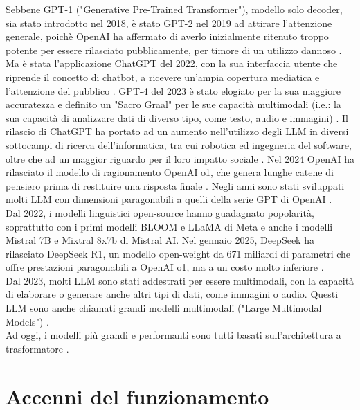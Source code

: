Sebbene GPT-1 ("Generative Pre-Trained Transformer"), modello solo decoder, sia stato introdotto nel 2018, è stato GPT-2 nel 2019 ad attirare l'attenzione generale, poichè OpenAI ha affermato di averlo inizialmente ritenuto troppo potente per essere rilasciato pubblicamente, per timore di un utilizzo dannoso \cite{hern2019fakeai}. Ma è stata l'applicazione ChatGPT del 2022, con la sua interfaccia utente che riprende il concetto di chatbot, a ricevere un'ampia copertura mediatica e l'attenzione del pubblico \cite{euronews2023chatgpt}. GPT-4 del 2023 è stato elogiato per la sua maggiore accuratezza e definito un "Sacro Graal" per le sue capacità multimodali (i.e.: la sua capacità di analizzare dati di diverso tipo, come testo, audio e immagini) \cite{heaven2023gpt4}. Il rilascio di ChatGPT ha portato ad un aumento nell'utilizzo degli LLM in diversi sottocampi di ricerca dell'informatica, tra cui robotica ed ingegneria del software, oltre che ad un maggior riguardo per il loro impatto sociale \cite{movva2024topics}. Nel 2024 OpenAI ha rilasciato il modello di ragionamento OpenAI o1, che genera lunghe catene di pensiero prima di restituire una risposta finale \cite{metz2024openai}. Negli anni sono stati sviluppati molti LLM con dimensioni paragonabili a quelli della serie GPT di OpenAI \cite{ourworldindata2023parameters}. \\
Dal 2022, i modelli linguistici open-source hanno guadagnato popolarità, soprattutto con i primi modelli BLOOM e LLaMA di Meta e anche i modelli Mistral 7B e Mixtral 8x7b di Mistral AI. Nel gennaio 2025, DeepSeek ha rilasciato DeepSeek R1, un modello open-weight da 671 miliardi di parametri che offre prestazioni paragonabili a OpenAI o1, ma a un costo molto inferiore \cite{sharma2025deepseek}. \\
Dal 2023, molti LLM sono stati addestrati per essere multimodali, con la capacità di elaborare o generare anche altri tipi di dati, come immagini o audio. Questi LLM sono anche chiamati grandi modelli multimodali ("Large Multimodal Models") \cite{zia2024multimodal}. \\
Ad oggi, i modelli più grandi e performanti sono tutti basati sull'architettura a trasformatore \cite{merritt2022transformer}.

\section{Accenni del funzionamento}

